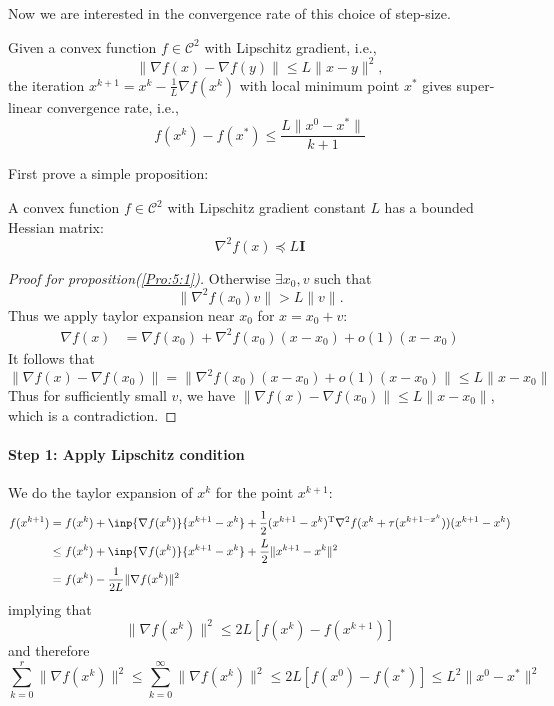 Now we are interested in the convergence rate of this choice of step-size.
\begin{theorem}
Given a convex function $f\in\mathcal{C}^2$ with Lipschitz gradient, i.e.,
\[
\|\nabla f(x)-\nabla f(y)\|\le L\|x-y\|^2,
\]
the iteration $x^{k+1} = x^k-\frac{1}{L}\nabla f(x^k)$ with local minimum point $x^*$ gives \mbox{super-linear} convergence rate, i.e.,
\[
f(x^k) - f(x^*)\le\frac{L\|x^0-x^*\|}{k+1}
\]
\end{theorem}
First prove a simple proposition:
\begin{proposition}\label{Pro:5:1}
A convex function $f\in\mathcal{C}^2$ with Lipschitz gradient constant $L$ has a bounded Hessian matrix:
\[
\nabla^2f(x)\preceq L\bm I
\]
\end{proposition}
\begin{proof}[Proof for proposition(\ref{Pro:5:1})]
Otherwise $\exists x_0,v$ such that
\[
\|\nabla^2f(x_0)v\|>L\|v\|.
\]
Thus we apply taylor expansion near $x_0$ for $x=x_0+v$:
\begin{align*}
\nabla f(x)&=\nabla f(x_0)+\nabla^2f(x_0)(x-x_0)+o(1)(x-x_0)
\end{align*}
It follows that 
\[
\|\nabla f(x)-\nabla f(x_0)\|= \|\nabla^2f(x_0)(x-x_0)+o(1)(x-x_0)\|\le L\|x-x_0\|
\]
Thus for sufficiently small $v$, we have $\|\nabla f(x)-\nabla f(x_0)\|\le L\|x-x_0\|$, which is a contradiction.
\end{proof}
\paragraph{Step 1: Apply Lipschitz condition}
We do the taylor expansion of $x^{k}$ for the point $x^{k+1}$:
\begin{align*}
f(x^{k+1})&=f(x^k)+\inp{\nabla f(x^k)}{x^{k+1} - x^k}+\frac{1}{2}(x^{k+1} - x^k)\trans\nabla^2 f(x^k+\tau (x^{k+1 - x^k}))(x^{k+1} - x^k)\\
&\le f(x^k)+\inp{\nabla f(x^k)}{x^{k+1} - x^k}+\frac{L}{2}\|x^{k+1} - x^k\|^2\\
&=f(x^k)-\frac{1}{2L}\|\nabla f(x^k)\|^2
\end{align*}
implying that
\[
\|\nabla f(x^k)\|^2\le2L[f(x^k) - f(x^{k+1})]
\]
and therefore 
\begin{equation}\label{Eq:5:5}
\sum_{k=0}^r\|\nabla f(x^k)\|^2\le
\sum_{k=0}^\infty \|\nabla f(x^k)\|^2\le
 2L[f(x^0) - f(x^{*})]
\le L^2\|x^0-x^*\|^2
\end{equation}
